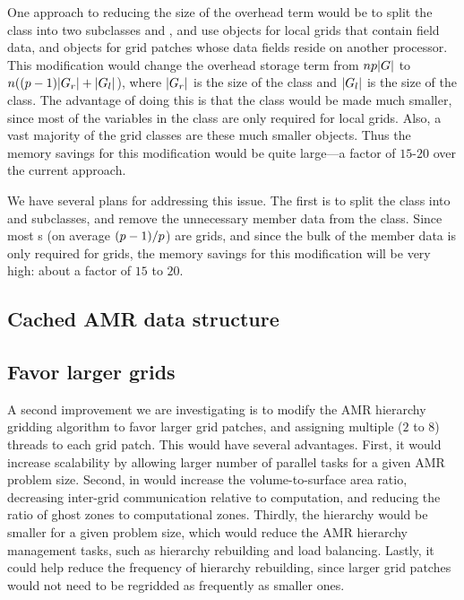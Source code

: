 \documentclass{article}
\begin{document}
One approach to reducing the size of the overhead term would be
to split the  class into two subclasses 
and , and use   objects for local grids
that contain field data, and  objects for grid
patches whose data fields reside on another processor.
This modification would change the overhead storage term from
$n p |G|$ to $n ((p-1)
|G_r| + |G_l|$), where $|G_r|$ is the
size of the  class and $|G_l|$ is the size
of the  class.  The advantage of doing this is that the
 class would be made much smaller, since most of
the variables in the  class are only required for local
grids.  Also, a vast majority of the grid classes are these much
smaller  objects.  Thus the memory savings for this
modification would be quite large---a factor of $15$-$20$ over the
current approach.

 We have several plans for addressing this issue.  The first is to
 split the  class into  and
  subclasses, and remove the unnecessary member
 data from the  class.  Since most s (on
 average $(p-1)/p$) are  grids, and
 since the bulk of the member data is only required for
  grids, the memory savings for this modification
 will be very high: about a factor of $15$ to $20$.

\subsection{Cached AMR data structure}  \label{solution:amr-cache}
\subsection{Favor larger grids}\label{solution:amr-large-grids}

 A second improvement we are investigating is to modify the AMR
 hierarchy gridding algorithm to favor larger grid patches, and
 assigning multiple ($2$ to $8$) threads to each grid patch.  This
 would have several advantages.  First, it would increase scalability
 by allowing larger number of parallel tasks for a given AMR problem
 size.  Second, in would increase the volume-to-surface area ratio,
 decreasing inter-grid communication relative to computation, and
 reducing the ratio of ghost zones to computational zones.  Thirdly,
 the hierarchy would be smaller for a given problem size, which would
 reduce the AMR hierarchy management tasks, such as hierarchy
 rebuilding and load balancing.  Lastly, it could help reduce the
 frequency of hierarchy rebuilding, since larger grid patches would
 not need to be regridded as frequently as smaller ones.
\end{document}
